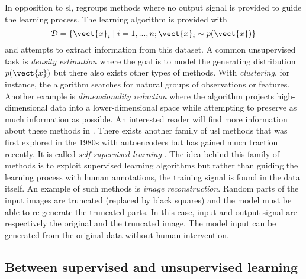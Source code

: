 In opposition to \acrlong{sl},  regroups methods where no output
signal is provided to guide the learning process. The learning algorithm is provided
with
\begin{equation}
\mathcal{D} = \left\{\vect{x}_i \mid i = 1,..., n ; \vect{x}_i \sim p(\vect{x})\right\}
\end{equation}
and attempts to extract information from this dataset. A common unsupervised task
is \textit{density estimation} where the goal is to model the generating distribution
$p(\vect{x})$ but there also exists other types of methods. With \textit{clustering},
for instance, the algorithm searches for natural groups of observations or features.
Another example is \textit{dimensionality reduction} where the algorithm projects
high-dimensional data into a lower-dimensional space while attempting to preserve
as much information as possible. An interested reader will find more information
about these methods in \parencite{friedman2017elements}. There exists another
family of \acrlong{usl} methods that was first explored in the 1980s with autoencoders
but has gained much traction recently. It is called \textit{self-supervised learning}
\parencite{lecun2021self}. The idea behind this family of methods is to exploit
supervised learning algorithms but rather than guiding the learning process with
human annotations, the training signal is found in the data itself. An example of
such methods is \textit{image reconstruction}. Random parts of the input images
are truncated (\eg replaced by black squares) and the model must be able to
re-generate the truncated parts. In this case, input and output signal are
respectively the original and the truncated image. The model input can be generated
from the original data without human intervention.

\subsection{Between supervised and unsupervised learning}
\label{ssec:backml:inbetween}

